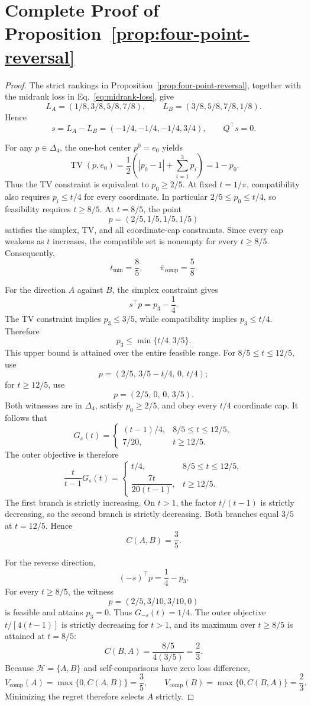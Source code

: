 \documentclass[preprint,review,12pt]{elsarticle}
\newcommand{\Hlib}{\mathcal{H}}
\newcommand{\TV}{\operatorname{TV}}
\begin{document}
\appendix
\section{Complete Proof of Proposition~\ref{prop:four-point-reversal}}
\label{app:four-point-proof}

\begin{proof}
The strict rankings in Proposition~\ref{prop:four-point-reversal}, together
with the midrank loss in Eq.~\eqref{eq:midrank-loss}, give
\[
L_A=(1/8,3/8,5/8,7/8),\qquad
L_B=(3/8,5/8,7/8,1/8).
\]
Hence
\[
s=L_A-L_B=(-1/4,-1/4,-1/4,3/4),
\qquad Q^\top s=0.
\]

For any \(p\in\Delta_4\), the one-hot center \(p^0=e_0\) yields
\[
\TV(p,e_0)
=\frac12\left(|p_0-1|+\sum_{i=1}^{3}p_i\right)
=1-p_0.
\]
Thus the TV constraint is equivalent to \(p_0\geq2/5\). At fixed
\(t=1/\pi\), compatibility also requires \(p_i\leq t/4\) for every
coordinate. In particular \(2/5\leq p_0\leq t/4\), so feasibility requires
\(t\geq8/5\). At \(t=8/5\), the point
\[
p=(2/5,1/5,1/5,1/5)
\]
satisfies the simplex, TV, and all coordinate-cap constraints. Since every cap
weakens as \(t\) increases, the compatible set is nonempty for every
\(t\geq8/5\). Consequently,
\[
t_{\min}=\frac85,\qquad
\bar\pi_{\mathrm{comp}}=\frac58.
\]

For the direction \(A\) against \(B\), the simplex constraint gives
\[
s^\top p=p_3-\frac14.
\]
The TV constraint implies \(p_3\leq3/5\), while compatibility implies
\(p_3\leq t/4\). Therefore
\[
p_3\leq\min\{t/4,3/5\}.
\]
This upper bound is attained over the entire feasible range. For
\(8/5\leq t\leq12/5\), use
\[
p=(2/5,\,3/5-t/4,\,0,\,t/4);
\]
for \(t\geq12/5\), use
\[
p=(2/5,\,0,\,0,\,3/5).
\]
Both witnesses are in \(\Delta_4\), satisfy \(p_0\geq2/5\), and obey every
\(t/4\) coordinate cap. It follows that
\[
G_s(t)=
\begin{cases}
(t-1)/4,&8/5\leq t\leq12/5,\\
7/20,&t\geq12/5.
\end{cases}
\]
The outer objective is therefore
\[
\frac{t}{t-1}G_s(t)=
\begin{cases}
t/4,&8/5\leq t\leq12/5,\\[2pt]
\dfrac{7t}{20(t-1)},&t\geq12/5.
\end{cases}
\]
The first branch is strictly increasing. On \(t>1\), the factor
\(t/(t-1)\) is strictly decreasing, so the second branch is strictly
decreasing. Both branches equal \(3/5\) at \(t=12/5\). Hence
\[
C(A,B)=\frac35.
\]

For the reverse direction,
\[
(-s)^\top p=\frac14-p_3.
\]
For every \(t\geq8/5\), the witness
\[
p=(2/5,3/10,3/10,0)
\]
is feasible and attains \(p_3=0\). Thus \(G_{-s}(t)=1/4\). The outer
objective \(t/[4(t-1)]\) is strictly decreasing for \(t>1\), and its maximum
over \(t\geq8/5\) is attained at \(t=8/5\):
\[
C(B,A)=\frac{8/5}{4(3/5)}=\frac23.
\]
Because \(\Hlib=\{A,B\}\) and self-comparisons have zero loss difference,
\[
V_{\mathrm{comp}}(A)=\max\{0,C(A,B)\}=\frac35,\qquad
V_{\mathrm{comp}}(B)=\max\{0,C(B,A)\}=\frac23.
\]
Minimizing the regret therefore selects \(A\) strictly.


\end{proof}
\end{document}
